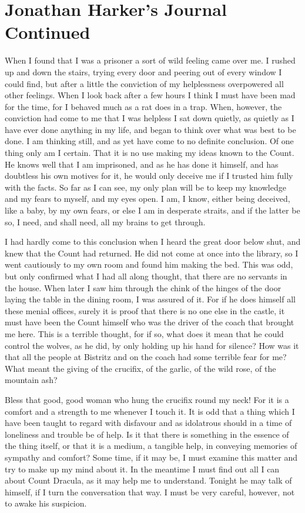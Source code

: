 \chapter{Jonathan Harker's Journal Continued}

When I found that I was a prisoner a sort of wild feeling came over me. I rushed up and down the stairs, trying every door and peering out of every window I could find, but after a little the conviction of my helplessness overpowered all other feelings. When I look back after a few hours I think I must have been mad for the time, for I behaved much as a rat does in a trap. When, however, the conviction had come to me that I was helpless I sat down quietly, as quietly as I have ever done anything in my life, and began to think over what was best to be done. I am thinking still, and as yet have come to no definite conclusion. Of one thing only am I certain. That it is no use making my ideas known to the Count. He knows well that I am imprisoned, and as he has done it himself, and has doubtless his own motives for it, he would only deceive me if I trusted him fully with the facts. So far as I can see, my only plan will be to keep my knowledge and my fears to myself, and my eyes open. I am, I know, either being deceived, like a baby, by my own fears, or else I am in desperate straits, and if the latter be so, I need, and shall need, all my brains to get through. 

I had hardly come to this conclusion when I heard the great door below shut, and knew that the Count had returned. He did not come at once into the library, so I went cautiously to my own room and found him making the bed. This was odd, but only confirmed what I had all along thought, that there are no servants in the house. When later I saw him through the chink of the hinges of the door laying the table in the dining room, I was assured of it. For if he does himself all these menial offices, surely it is proof that there is no one else in the castle, it must have been the Count himself who was the driver of the coach that brought me here. This is a terrible thought, for if so, what does it mean that he could control the wolves, as he did, by only holding up his hand for silence? How was it that all the people at Bistritz and on the coach had some terrible fear for me? What meant the giving of the crucifix, of the garlic, of the wild rose, of the mountain ash? 

Bless that good, good woman who hung the crucifix round my neck! For it is a comfort and a strength to me whenever I touch it. It is odd that a thing which I have been taught to regard with disfavour and as idolatrous should in a time of loneliness and trouble be of help. Is it that there is something in the essence of the thing itself, or that it is a medium, a tangible help, in conveying memories of sympathy and comfort? Some time, if it may be, I must examine this matter and try to make up my mind about it. In the meantime I must find out all I can about Count Dracula, as it may help me to understand. Tonight he may talk of himself, if I turn the conversation that way. I must be very careful, however, not to awake his suspicion. 

